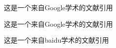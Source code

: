 \documentclass{article}
\begin{document}
	这是一个来自Google学术的文献引用\cite{__2021}
	
	这是一个来自Google学术的文献引用\citep{__2022-2}
	
	这是一个来自baidu学术的文献引用\cite{ngiam_multimodal_2009}
	
	\nocite{*}   %
	
\end{document}
